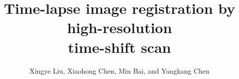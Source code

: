 
\title{Time-lapse image registration by high-resolution \\ time-shift scan}

\author{Xingye Liu\footnotemark[1], Xiaohong Chen\footnotemark[2], Min Bai\footnotemark[3], and Yangkang Chen\footnotemark[4]}

\renewcommand{\thefootnote}{\fnsymbol{footnote}}
%


\address{
\footnotemark[1]
College of Geology and Environment\\
Xi’an University of Science and Technology\\
Xi’an, Shaanxi Province, China, 710054 \\
lwxwyh506673@126.com\\
\footnotemark[2]State Key Laboratory of Petroleum Resources and Prospecting \\
China University of Petroleum \\
Fuxue Road 18th\\
Beijing, China, 102200 \\
\footnotemark[3]
Key Laboratory of Exploration Technology for Oil and Gas Resources of Ministry of Education\\
Yangtze University\\
Wuhan, Hubei Province, China, 430100 \\
\footnotemark[4]
School of Earth Sciences\\
Zhejiang University\\
Hangzhou, Zhejiang Province, China, 310027\\
}


